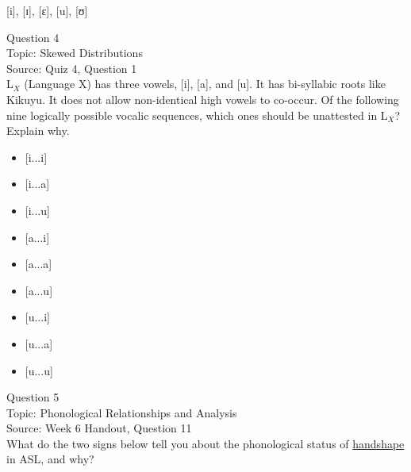 \documentclass[12pt]{article}
\begin{document}
{[i]}, {[ɪ]}, {[ɛ]}, {[u]}, {[ʊ]}


\newpage

{\large Question 4}\\

Topic: Skewed Distributions\\
Source: Quiz 4, Question 1\\

L$_X$ (Language X) has three vowels, [i], [a], and [u]. It has bi-syllabic roots like Kikuyu. It does not allow non-identical high vowels to co-occur. Of the following nine logically possible vocalic sequences, which ones should be unattested in L$_X$? Explain why.\\

\begin{itemize} \item {[i...i]} \item {[i...a]} \item {[i...u]} \item {[a...i]} \item {[a...a]} \item {[a...u]} \item {[u...i]} \item {[u...a]} \item {[u...u]} \end{itemize}


\newpage

{\large Question 5}\\

Topic: Phonological Relationships and Analysis\\
Source: Week 6 Handout, Question 11\\

What do the two signs below tell you about the phonological status of \underline{handshape} in ASL, and why?\\
\end{document}
